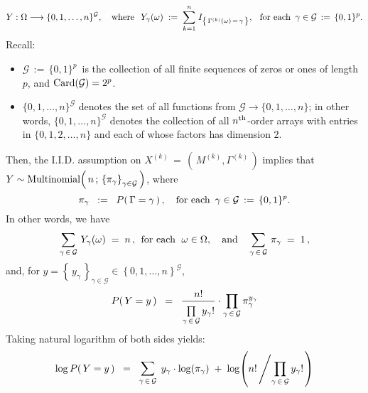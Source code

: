 \begin{remark}
\begin{equation*}
Y : \Omega \longrightarrow \{0,1,\ldots,n\}^{\mathcal{G}},
\quad\textnormal{where}\;\;\,
Y_{\gamma}(\omega) \; := \; \overset{n}{\underset{k=1}{\sum}}\;I_{\left\{\,\Gamma^{(k)}(\omega) \,=\, \gamma\,\right\}},
\;\;\,\textnormal{for each \,$\gamma\in\mathcal{G} \,:=\, \{0,1\}^{p}$}.
\end{equation*}
Recall:
\begin{itemize}
\item
	$\mathcal{G} \,:=\, \{0,1\}^{p}$\, is the collection of all finite sequences of zeros or ones of length $p$,
	and $\textnormal{Card}\!\left(\mathcal{G}\right) = 2^{p}$.
\item
	$\{0,1,\ldots,n\}^{\mathcal{G}}$ denotes the set of all functions from $\mathcal{G} \longrightarrow \{0,1,\ldots,n\}$;
	in other words, $\{0,1,\ldots,n\}^{\mathcal{G}}$ denotes the collection of all $n^{\textnormal{th}}$-order arrays
	with entries in $\{0,1,2,\ldots,n\}$ and each of whose factors has dimension $2$.
\end{itemize}
Then, the I.I.D. assumption on $X^{(k)} \,=\, \left(\,M^{(k)},\Gamma^{(k)}\,\right)$ implies that
\,$Y \sim \textnormal{Multinomial}\!\left(\,n\,;\,\left\{\pi_{\gamma}\right\}_{\gamma\in\mathcal{G}}\,\right)$,
where
\begin{equation*}
\pi_{\gamma} \;\; := \;\; P\!\left(\,\Gamma = \gamma\,\right),
\quad\textnormal{for each \,$\gamma\in\mathcal{G}\,:=\,\{0,1\}^{p}$}.
\end{equation*}
In other words, we have
\begin{equation*}
\sum_{\gamma\,\in\,\mathcal{G}}\,Y_{\gamma}(\omega) \; = \; n\,,
\;\,\textnormal{for each \;$\omega\in\Omega$},
\quad\textnormal{and}\quad
\sum_{\gamma\,\in\,\mathcal{G}}\,\pi_{\gamma} \; = \; 1\,,
\end{equation*}
and, for $y = \left\{\,y_{\gamma}\,\right\}_{\gamma\in\mathcal{G}} \in \left\{0,1,\ldots,n\right\}^{\mathcal{G}}$,
\begin{equation*}
P\!\left(\,Y = y\,\right)
\;\; = \;\;
\dfrac{n!}{\overset{{\color{white}.}}{\underset{\gamma\,\in\,\mathcal{G}}{\prod}}\,y_{\gamma}!}
\cdot
\underset{\gamma\,\in\,\mathcal{G}}{\prod}\, \pi_{\gamma}^{y_{\gamma}}
\end{equation*}
Taking natural logarithm of both sides yields:
\begin{equation*}
\log P\!\left(\,Y = y\,\right)
\;\; = \;\;
\underset{\gamma\,\in\,\mathcal{G}}{\textnormal{\large$\sum$}}\;\, y_{\gamma}\cdot\log\!\left(\pi_{\gamma}\right)
\; + \;
\log\!\left(n!\left/\overset{{\color{white}.}}{\underset{\gamma\,\in\,\mathcal{G}}{\prod}}\,y_{\gamma}!\right.\right)

\end{equation*}
\end{remark}

